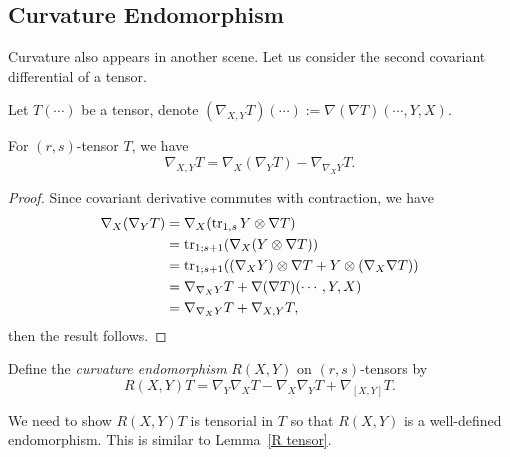 \subsection*{Curvature Endomorphism}
Curvature also appears in another scene.
Let us consider the second covariant differential of a tensor.

\begin{defn}
    Let $T(\cdots)$ be a tensor, denote $(\nabla_{X,Y}T)(\cdots):=\nabla(\nabla T)(\cdots,Y,X)$.
\end{defn}

\begin{prop}
    For $(r,s)$-tensor $T$, we have
    \begin{equation}
        \nabla_{X,Y}T=\nabla_X(\nabla_YT)-\nabla_{\nabla_XY}T.\label{2nd cov deriv}
    \end{equation}
\end{prop}
\begin{proof}
    Since covariant derivative commutes with contraction, we have
    \begin{align*}
        \nabla_X(\nabla_YT)&=\nabla_X(\operatorname{tr}_{1,s}Y\otimes\nabla T)\\
        &=\operatorname{tr}_{1;s+1}(\nabla_X(Y\otimes\nabla T))\\
        &=\operatorname{tr}_{1;s+1}((\nabla_XY)\otimes\nabla T+Y\otimes(\nabla_X\nabla T))\\
        &=\nabla_{\nabla_XY}T+\nabla(\nabla T)(\cdots,Y,X)\\
        &=\nabla_{\nabla_XY}T+\nabla_{X,Y}T,
    \end{align*}
    then the result follows.
\end{proof}

\begin{defn}
    Define the \emph{curvature endomorphism} $R(X,Y)$ on $(r,s)$-tensors by
    \[R(X,Y)T=\nabla_Y\nabla_XT-\nabla_X\nabla_YT+\nabla_{[X,Y]}T.\]
\end{defn}

\begin{rem}
    We need to show $R(X,Y)T$ is tensorial in $T$ so that $R(X,Y)$ is a well-defined endomorphism.
    This is similar to Lemma~\ref{R tensor}.
\end{rem}

